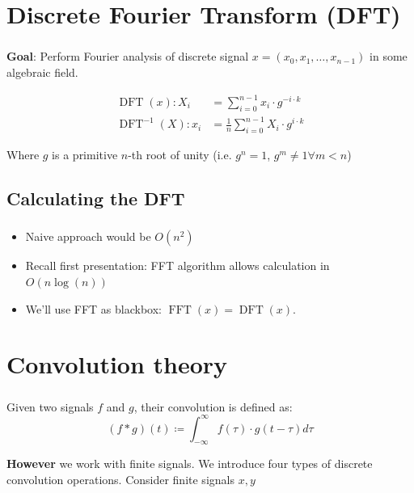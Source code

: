 \documentclass{beamer}
\DeclareMathOperator{\DFT}{DFT}
\DeclareMathOperator{\FFT}{FFT}
\begin{document}
\section{Discrete Fourier Transform (DFT)}

\begin{frame}
		\frametitle{\secname}

		\textbf{Goal}: Perform Fourier analysis of discrete signal $x = (x_0,
		x_1, \ldots, x_{n-1})$ in some algebraic field.

		\begin{align*}
				\operatorname{DFT}(x): X_i & = \sum_{i=0}^{n-1} x_i \cdot g^{-i \cdot k} \\
				\operatorname{DFT}^{-1}(X): x_i & = \frac{1}{n} \sum_{i=0}^{n-1} X_i \cdot g^{i \cdot k}
		\end{align*}

		Where $g$ is a primitive $n$-th root of unity (i.e. $g^n = 1$, $g^m
		\neq 1 \forall m < n$)
\end{frame}

\subsection{Calculating the DFT}

\begin{frame}
		\frametitle{\secname}
		\framesubtitle{\subsecname}

		\begin{itemize}
				\item Naive approach would be $O(n^2)$
				\item Recall first presentation: FFT algorithm allows calculation in $O(n \log(n))$
				\item We'll use FFT as blackbox: $\FFT(x) = \DFT(x)$.
		\end{itemize}
\end{frame}

\section{Convolution theory}

\begin{frame}
		\frametitle{\secname}

		Given two signals $f$ and $g$, their convolution is defined as:
		\[
				(f * g)(t) \coloneqq \int_{-\infty}^{\infty} f(\tau) \cdot g(t - \tau) d\tau
		\]

		
		\textbf{However} we work with finite signals. We introduce four types
		of discrete convolution operations. Consider finite signals $x, y$
\end{frame}
\end{document}
